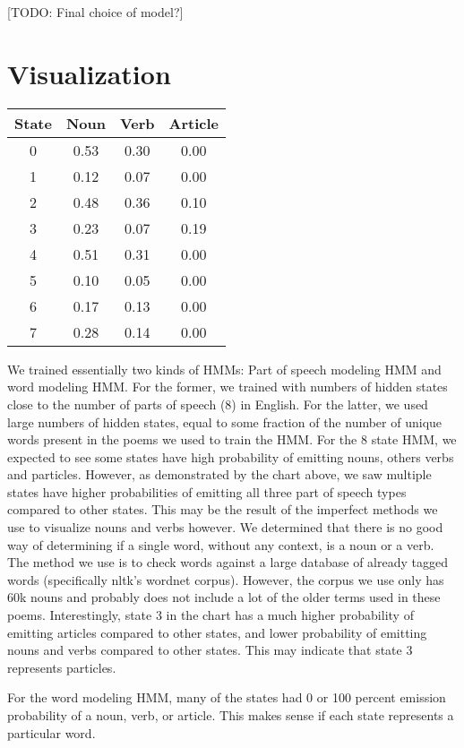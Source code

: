 [TODO: Final choice of model?]

\section{Visualization}
\begin{tabular}{|c|c|c|c|}
\hline 
State & Noun & Verb & Article \\ 
\hline 
0 & 0.53 & 0.30 & 0.00 \\ 
\hline 
1 & 0.12 & 0.07 & 0.00 \\ 
\hline 
2 & 0.48 & 0.36 & 0.10 \\ 
\hline 
3 & 0.23 & 0.07 & 0.19 \\ 
\hline 
4 & 0.51 & 0.31 & 0.00 \\ 
\hline 
5 & 0.10 & 0.05 & 0.00 \\ 
\hline 
6 & 0.17 & 0.13 & 0.00 \\ 
\hline 
7 & 0.28 & 0.14 & 0.00 \\ 
\hline 
\end{tabular} 

We trained essentially two kinds of HMMs: Part of speech modeling HMM and word modeling HMM. For the former, we trained with numbers of hidden states close to the number of parts of speech (8) in English. For the latter, we used large numbers of hidden states, equal to some fraction of the number of unique words present in the poems we used to train the HMM.  For the 8 state HMM, we expected to see some states have high probability of emitting nouns, others verbs and particles. However, as demonstrated by the chart above, we saw multiple states have higher probabilities of emitting all three part of speech types compared to other states. This may be the result of the imperfect methods we use to visualize nouns and verbs however. We determined that there is no good way of determining if a single word, without any context, is a noun or a verb. The method we use is to check words against a large database of already tagged words (specifically nltk's wordnet corpus). However, the corpus we use only has 60k nouns and probably does not include a lot of the older terms used in these poems. Interestingly, state 3 in the chart has a much higher probability of emitting articles compared to other states, and lower probability of emitting nouns and verbs compared to other states. This may indicate that state 3 represents particles. 

For the word modeling HMM, many of the states had 0 or 100 percent emission probability of a noun, verb, or article. This makes sense if each state represents a particular word. 

